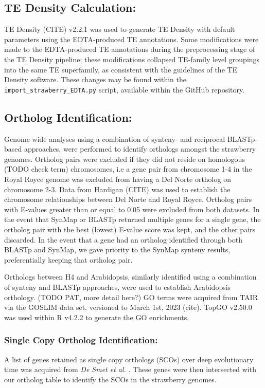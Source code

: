 \documentclass[fleqn,10pt]{olplainarticle}
\begin{document}
\subsection{TE Density Calculation:} \label{sec:density_methods}
TE Density (CITE) v2.2.1 was used to generate TE Density with default parameters using the EDTA-produced TE annotations.
Some modifications were made to the EDTA-produced TE annotations during the preprocessing stage of the TE Density pipeline; these modifications collapsed TE-family level groupings into the same TE superfamily, as consistent with the guidelines of the TE Density software.
These changes may be found within the \verb|import_strawberry_EDTA.py| script, available within the GitHub repository.





\subsection{Ortholog Identification:} \label{sec:methods_orthologs}
Genome-wide analyses using a combination of synteny- and reciprocal BLASTp- based approaches, were performed to identify orthologs amongst the strawberry genomes.
Ortholog pairs were excluded if they did not reside on homologous (TODO check term) chromosomes, i.e a gene pair from chromosome 1-4 in the Royal Royce genome was excluded from having a Del Norte ortholog on chromosome 2-3.
Data from Hardigan (CITE) was used to establish the chromosome relationships between Del Norte and Royal Royce.
Ortholog pairs with E-values greater than or equal to 0.05 were excluded from both datasets.
In the event that SynMap or BLASTp returned multiple genes for a single gene, the ortholog pair with the best (lowest) E-value score was kept, and the other pairs discarded.
In the event that a gene had an ortholog identified through both BLASTp and SynMap, we gave priority to the SynMap synteny results, preferentially keeping that ortholog pair. 

Orthologs between H4 and Arabidopsis, similarly identified using a combination of synteny and BLASTp approaches, were used to establish Arabidopsis orthology.
(TODO PAT, more detail here?)
GO terms were acquired from TAIR via the GOSLIM data set, versioned to March 1st, 2023 (cite).
TopGO v2.50.0 was used within R v4.2.2 to generate the GO enrichments.

\subsubsection{Single Copy Ortholog Identification:} \label{sec:methods_single_copy}
A list of genes retained as single copy orthologs (SCOs) over deep evolutionary time was acquired from \textit{De Smet et al.} \cite{DeSmet2013}.
These genes were then intersected with our ortholog table to identify the SCOs in the strawberry genomes.
\end{document}
